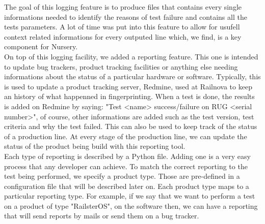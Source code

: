 \documentclass[12pt]{article}
\begin{document}
The goal of this logging feature is to produce files that contains every single informations needed to identify the reasons of test failure and contains all the tests parameters. A lot of time was put into this feature to allow for usufell context related informations for every outputed line which, we find, is a key component for Nursery.\\

On top of this logging facility, we added a reporting feature. This one is intended to update bug trackers, product tracking facilities or anything else needing informations about the status of a particular hardware or software. Typically, this is used to update a product tracking server, Redmine, used at Railnova to keep an history of what happenned in fingerprinting. When a test is done, the results is added on Redmine by saying: "Test <name> success/failure on RUG <serial number>", of course, other informations are added such as the test version, test criteria and why the test failed. This can also be used to keep track of the status of a production line. At every stage of the production line, we can update the status of the product being build with this reporting tool.\\

Each type of reporting is described by a Python file. Adding one is a very easy process that any developer can achieve. To match the correct reporting to the test being performed, we specify a product type. Those are pre-defined in a configuration file that will be described later on. Each product type maps to a particular reporting type. For example, if we say that we want to perform a test on a product of type "RailsterOS", on the software then, we can have a reporting that will send reports by mails or send them on a bug tracker.\\
\end{document}
